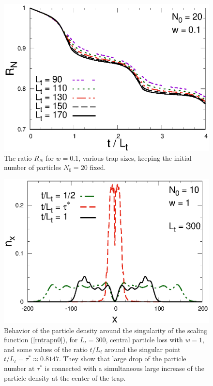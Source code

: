   \begin{figure}[!htb]
\centering
  \includegraphics[width=0.65\columnwidth]{imm/RNtrapNo20w01.eps}
  \caption{The ratio $R_N$ for $w=0.1$, various trap sizes, keeping the
    initial number of particles $N_0=20$ fixed.}
  \label{trapNow01}
  \end{figure}
  
  \begin{figure}[!htb]
\centering
  \includegraphics[width=0.65\columnwidth]{imm/nxtrap.eps}
  \caption{ Behavior of the particle density around the singularity of
    the scaling function (\ref{rntrapn0}), for $L_t=300$, central
    particle loss with $w=1$, and some values of the ratio $t/L_t$
    around the singular point $t/L_t =\tau^*\approx 0.8147$. They show
    that large drop of the particle number at $\tau^*$ is connected with
    a simultaneous large increase of the particle density at the center
    of the trap.  }
  \label{trapnx}
  \end{figure}
  
  
  
  
  
